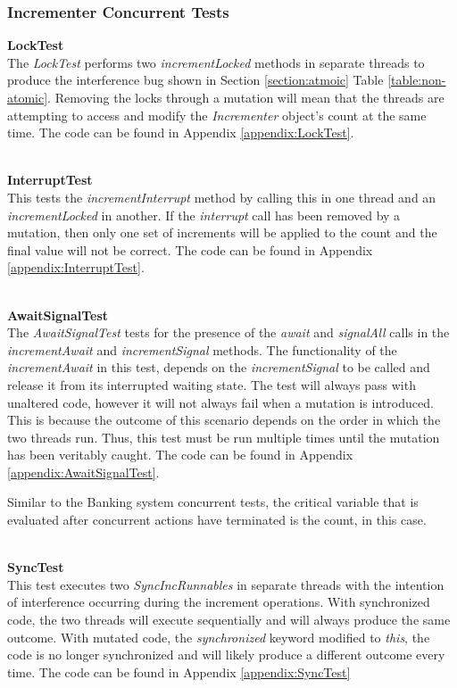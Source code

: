 \documentclass[a4paper,12pt]{article}
\begin{document}
\subsubsection{Incrementer Concurrent Tests}

\textbf{LockTest}
\\The \textit{LockTest} performs two \textit{incrementLocked} methods in separate threads to produce the interference bug shown in Section \ref{section:atmoic} Table \ref{table:non-atomic}. Removing the locks through a mutation will mean that the threads are attempting to access and modify the \textit{Incrementer} object's count at the same time. The code can be found in Appendix \ref{appendix:LockTest}. 

\textbf{\\InterruptTest}
\\This tests the \textit{incrementInterrupt} method by calling this in one thread and an \textit{incrementLocked} in another. If the \textit{interrupt} call has been removed by a mutation, then only one set of increments will be applied to the count and the final value will not be correct. The code can be found in Appendix \ref{appendix:InterruptTest}. 

\textbf{\\AwaitSignalTest}
\\The \textit{AwaitSignalTest} tests for the presence of the \textit{await} and \textit{signalAll} calls in the \textit{incrementAwait} and \textit{incrementSignal} methods. The functionality of the \textit{incrementAwait} in this test, depends on the \textit{incrementSignal} to be called and release it from its interrupted waiting state. The test will always pass with unaltered code, however it will not always fail when a mutation is introduced. This is because the outcome of this scenario depends on the order in which the two threads run. Thus, this test must be run multiple times until the mutation has been veritably caught. The code can be found in Appendix \ref{appendix:AwaitSignalTest}. 

Similar to the Banking system concurrent tests, the critical variable that is evaluated after concurrent actions have terminated is the count, in this case.   

\textbf{\\SyncTest}
\\This test executes two \textit{SyncIncRunnables} in separate threads with the intention of interference occurring during the increment operations. With synchronized code, the two threads will execute sequentially and will always produce the same outcome. With mutated code, the \textit{synchronized} keyword modified to \textit{this}, the code is no longer synchronized and will likely produce a different outcome every time. The code can be found in Appendix \ref{appendix:SyncTest}  
\end{document}

